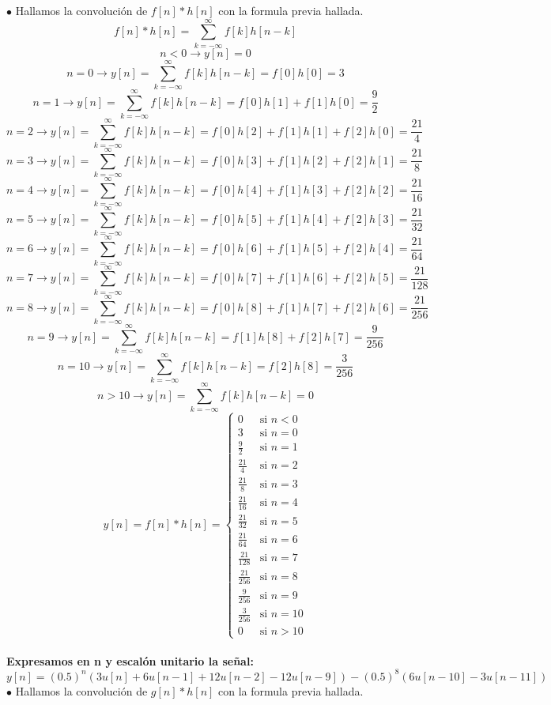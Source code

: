 \documentclass[11pt,a4paper]{article}
\begin{document}
{{\begin{enumerate}
$\bullet$ Hallamos la convolución de $f[n]*h[n]$ con la formula previa hallada.
$$f[n]*h[n]=\sum_{k=-\infty}^{\infty}f[k]h[n-k]$$
$$n<0 \rightarrow y[n]=0$$
$$n=0 \rightarrow y[n]=\sum_{k=-\infty}^{\infty}f[k]h[n-k]=f[0]h[0]=3$$
$$n=1 \rightarrow y[n]=\sum_{k=-\infty}^{\infty}f[k]h[n-k]=f[0]h[1]+f[1]h[0]=\frac{9}{2}$$
$$n=2 \rightarrow y[n]=\sum_{k=-\infty}^{\infty}f[k]h[n-k]=f[0]h[2]+f[1]h[1]+f[2]h[0]=\frac{21}{4}$$
$$n=3 \rightarrow y[n]=\sum_{k=-\infty}^{\infty}f[k]h[n-k]=f[0]h[3]+f[1]h[2]+f[2]h[1]=\frac{21}{8}$$
$$n=4 \rightarrow y[n]=\sum_{k=-\infty}^{\infty}f[k]h[n-k]=f[0]h[4]+f[1]h[3]+f[2]h[2]=\frac{21}{16}$$
$$n=5 \rightarrow y[n]=\sum_{k=-\infty}^{\infty}f[k]h[n-k]=f[0]h[5]+f[1]h[4]+f[2]h[3]=\frac{21}{32}$$
$$n=6 \rightarrow y[n]=\sum_{k=-\infty}^{\infty}f[k]h[n-k]=f[0]h[6]+f[1]h[5]+f[2]h[4]=\frac{21}{64}$$
$$n=7 \rightarrow y[n]=\sum_{k=-\infty}^{\infty}f[k]h[n-k]=f[0]h[7]+f[1]h[6]+f[2]h[5]=\frac{21}{128}$$
$$n=8 \rightarrow y[n]=\sum_{k=-\infty}^{\infty}f[k]h[n-k]=f[0]h[8]+f[1]h[7]+f[2]h[6]=\frac{21}{256}$$
$$n=9 \rightarrow y[n]=\sum_{k=-\infty}^{\infty}f[k]h[n-k]=f[1]h[8]+f[2]h[7]=\frac{9}{256}$$
$$n=10 \rightarrow y[n]=\sum_{k=-\infty}^{\infty}f[k]h[n-k]=f[2]h[8]=\frac{3}{256}$$
$$n>10 \rightarrow y[n]=\sum_{k=-\infty}^{\infty}f[k]h[n-k]=0$$
\begin{equation*}
y[n]=f[n]*h[n] =
\begin{cases}
0 & \text{si $n<0 $}\\
3 & \text{si $n= 0$}\\
\frac{9}{2} & \text{si $n= 1$}\\
\frac{21}{4} & \text{si $n= 2$}\\
\frac{21}{8} & \text{si $n= 3$}\\
\frac{21}{16} & \text{si $n= 4$}\\
\frac{21}{32} & \text{si $n= 5$}\\
\frac{21}{64} & \text{si $n=6$}\\
\frac{21}{128} & \text{si $n=7$}\\
\frac{21}{256} & \text{si $n=8$}\\
\frac{9}{256} & \text{si $n=9$}\\
\frac{3}{256} & \text{si $n=10$}\\
0 & \text{si $n>10$}
\end{cases}
\end{equation*}\\
\textbf{Expresamos en n y escalón unitario la señal:}
$$\boxed{y[n]=(0.5)^n(3u[n]+6u[n-1]+12u[n-2]-12u[n-9])-(0.5)^8(6u[n-10]-3u[n-11])}$$
$\bullet$ Hallamos la convolución de $g[n]*h[n]$ con la formula previa hallada.

\end{enumerate}}}
\end{document}

